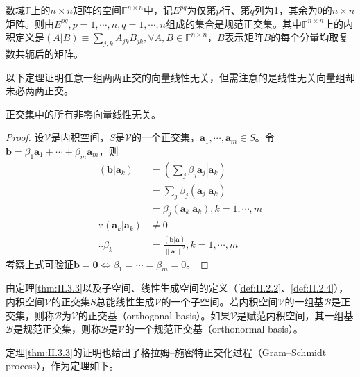 \documentclass[main.tex]{subfiles}
\begin{document}
\begin{example}\label{exp:II.3.2}
数域$\mathbb{F}$上的$n\times n$矩阵的空间$\mathbb{F}^{n\times n}$中，记$E^{pq}$为仅第$p$行、第$q$列为1，其余为0的$n\times n$矩阵。则由$E^{pq},p=1,\cdots,n,q=1,\cdots,n$组成的集合是规范正交集。其中$\mathbb{F}^{n\times n}$上的内积定义是$\left(A|B\right)\equiv\sum_{j,k}A_{jk}\overline{B}_{jk},\forall A, B\in\mathbb{F}^{n\times n}$，$\overline{B}$表示矩阵$B$的每个分量均取复数共轭后的矩阵。
\end{example}

以下定理证明任意一组两两正交的向量线性无关，但需注意的是线性无关向量组却未必两两正交。

\begin{theorem}\label{thm:II.3.3}
正交集中的所有非零向量线性无关。
\end{theorem}
\begin{proof}
设$\mathcal{V}$是内积空间，$S$是$\mathcal{V}$的一个正交集，$\mathbf{a}_1,\cdots,\mathbf{a}_m\in S$。令$\mathbf{b}=\beta_1\mathbf{a}_1+\cdots+\beta_m\mathbf{a}_m$，则
\begin{align*}
\left(\mathbf{b}|\mathbf{a}_k\right)&=\left(\left.\sum_j\beta_j\mathbf{a}_j\right|\left.\mathbf{a}_k\right.\right)\\
&=\sum_j\beta_j\left(\mathbf{a}_j|\mathbf{a}_k\right)\\
&=\beta_j\left(\mathbf{a}_k|\mathbf{a}_k\right),k=1,\cdots,m\\
\because \left(\mathbf{a}_k|\mathbf{a}_k\right)&\neq 0\\
\therefore \beta_k&=\frac{\left(\mathbf{b}|\mathbf{a}\right)}{\left\|\mathbf{a}\right\|^2},k=1,\cdots,m
\end{align*}
考察上式可验证$\mathbf{b}=\mathbf{0}\Leftrightarrow\beta_1=\cdots=\beta_m=0$。
\end{proof}

由定理\ref{thm:II.3.3}以及子空间、线性生成空间的定义（\ref{def:II.2.2}、\ref{def:II.2.4}），内积空间$\mathcal{V}$的正交集$S$总能线性生成$\mathcal{V}$的一个子空间。若内积空间$\mathcal{V}$的一组基$\mathcal{B}$是正交集，则称$\mathcal{B}$为$\mathcal{V}$的正交基（orthogonal basis）。如果$\mathcal{V}$是赋范内积空间，其一组基$\mathcal{B}$是规范正交集，则称$\mathcal{B}$是$\mathcal{V}$的一个规范正交基（orthonormal basis）。

定理\ref{thm:II.3.3}的证明也给出了格拉姆--施密特正交化过程（Gram--Schmidt process），作为定理如下。
\end{document}
